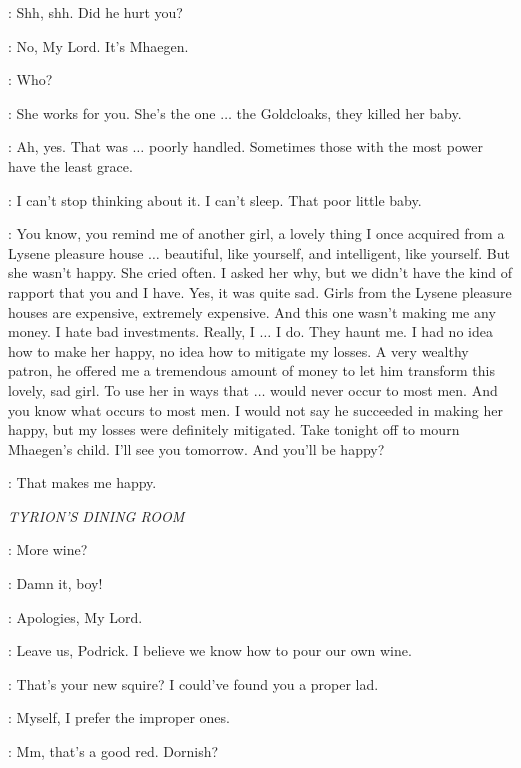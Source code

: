 \LITTLEFINGER: Shh, shh. Did he hurt you?

\ROS: No, My Lord. It's Mhaegen.

\LITTLEFINGER: Who?

\ROS: She works for you. She's the one $\ldots$ the Goldcloaks, they killed her baby.

\LITTLEFINGER: Ah, yes. That was $\ldots$ poorly handled. Sometimes those with the most power have the least grace.

\ROS: I can't stop thinking about it. I can't sleep. That poor little baby.

\LITTLEFINGER: You know, you remind me of another girl, a lovely thing I once acquired from a Lysene pleasure house $\ldots$ beautiful, like yourself, and intelligent, like yourself. But she wasn't happy. She cried often. I asked her why, but we didn't have the kind of rapport that you and I have. Yes, it was quite sad. Girls from the Lysene pleasure houses are expensive, extremely expensive. And this one wasn't making me any money. I hate bad investments. Really, I $\ldots$ I do. They haunt me. I had no idea how to make her happy, no idea how to mitigate my losses. A very wealthy patron, he offered me a tremendous amount of money to let him transform this lovely, sad girl. To use her in ways that $\ldots$ would never occur to most men. And you know what occurs to most men. I would not say he succeeded in making her happy, but my losses were definitely mitigated. Take tonight off to mourn Mhaegen's child. I'll see you tomorrow. And you'll be happy?


\LITTLEFINGER: That makes me happy.


\scene

\textit{TYRION'S DINING ROOM}


\PODRICK: More wine?


\JANOSSLYNT: Damn it, boy!

\PODRICK: Apologies, My Lord.

\TYRION: Leave us, Podrick. I believe we know how to pour our own wine.

\JANOSSLYNT: That's your new squire? I could've found you a proper lad.

\TYRION: Myself, I prefer the improper ones.

\JANOSSLYNT: Mm, that's a good red. Dornish?

